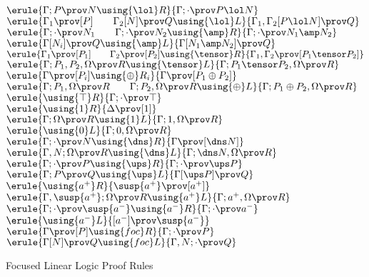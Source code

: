 
\begin{figure}
\begin{center}
\footnotesize
{}
$
\erule
{\Gamma; P \prov  N \using {\lol}R}
{\Gamma; \cdot \prov P \lol N}
$
\gap
$
\erule
{\Gamma_1 \prov [P] \qquad \Gamma_2[N] \prov Q \using {\lol}L}
{\Gamma_1,\Gamma_2 [P \lol N] \prov Q}
$
\gap
$
\erule
{\Gamma;\cdot\prov N_1  \qquad \Gamma;\cdot\prov N_2 \using {\amp}R}
{\Gamma;\cdot\prov N_1\amp N_2 }
$
\gap
$
\erule
{\Gamma [N_i] \prov Q \using {\amp}L}
{\Gamma [N_1 \amp N_2] \prov Q}
$
\gap
$
\erule
{\Gamma_1 \prov [P_1] \qquad \Gamma_2 \prov [P_2]\using {\tensor}R}
{\Gamma_1, \Gamma_2  \prov [P_1 \tensor P_2]}
$
\gap
$
\erule
{\Gamma; P_1, P_2, \Omega \prov R \using {\tensor}L}
{\Gamma; P_1\tensor P_2, \Omega  \prov  R}
$
\gap
$
\erule
{\Gamma \prov [P_i] \using {\oplus}R_i}
{\Gamma  \prov [P_1 \oplus P_2]}
$
\gap
$
\erule
{\Gamma; P_1, \Omega \prov R \qquad \Gamma; P_2, \Omega \prov R\using {\oplus}L}
{\Gamma; P_1\oplus P_2, \Omega \prov R}
$
\gap
$
\erule
{\using {\top}R}
{\Gamma;\cdot  \prov \top}
$
\gap
$
\erule
{\using {1}R}
{\Delta  \prov [1]}
$
\gap
$
\erule
{\Gamma; \Omega \prov R \using {1}L}
{\Gamma; 1, \Omega \prov R}
$
\gap
$
\erule
{\using {0}L}
{\Gamma; 0, \Omega \prov R}
$
\gap
$
\erule
{\Gamma;\cdot \prov N\using {\dns}R}
{\Gamma  \prov [\dns N]}
$
\gap
$
\erule
{\Gamma, N; \Omega \prov R \using {\dns}L}
{\Gamma; \dns N,  \Omega \prov R}
$
\gap
$
\erule
{\Gamma; \cdot \prov P\using {\ups}R}
{\Gamma; \cdot  \prov \ups P}
$
\gap
$
\erule
{\Gamma; P\prov Q \using {\ups}L}
{\Gamma[\ups P] \prov Q}
$
\gap
$
\erule
{\using {a^+}R}
{ \susp{a^+}  \prov [a^+ ]}
$
\gap
$
\erule
{\Gamma, \susp{a^+}; \Omega\prov R \using {a^+}L}
{\Gamma;  a^+, \Omega  \prov R}
$
\gap
$
\erule
{\Gamma; \cdot \prov \susp{a^-}\using {a^-}R}
{\Gamma; \cdot  \prov a^-}
$
\gap
$
\erule
{\using {a^-}L }
{[a^-] \prov \susp{a^-}}
$
\gap
$
\erule
{\Gamma \prov [P]\using {foc}R}
{\Gamma;\cdot  \prov P}
$
\gap
$
\erule
{\Gamma[N] \prov Q\using {foc}L}
{\Gamma,N;\cdot  \prov Q}
$

\end{center}
\caption{Focused Linear Logic Proof Rules \label{foc-rules}}
\end{figure}
